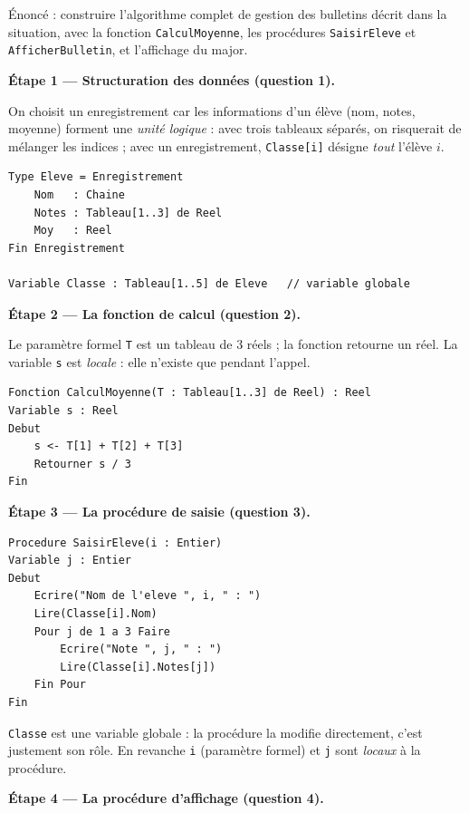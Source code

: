 \documentclass[11pt]{article}
\newcommand{\cle}[1]{{\popxbold\color{popdark}#1}}
\begin{document}
\begin{exoresolu}
Énoncé : construire l'algorithme complet de gestion des bulletins décrit dans la situation, avec la fonction \texttt{CalculMoyenne}, les procédures \texttt{SaisirEleve} et \texttt{AfficherBulletin}, et l'affichage du major.

\tcblower

\textbf{Étape 1 — Structuration des données (question 1).}

On choisit un enregistrement car les informations d'un élève (nom, notes, moyenne) forment une \emph{unité logique} : avec trois tableaux séparés, on risquerait de mélanger les indices ; avec un enregistrement, \texttt{Classe[i]} désigne \emph{tout} l'élève $i$.

\begin{lstlisting}
Type Eleve = Enregistrement
    Nom   : Chaine
    Notes : Tableau[1..3] de Reel
    Moy   : Reel
Fin Enregistrement

Variable Classe : Tableau[1..5] de Eleve   // variable globale
\end{lstlisting}

\textbf{Étape 2 — La fonction de calcul (question 2).}

Le paramètre formel \texttt{T} est un tableau de 3 réels ; la fonction retourne un réel. La variable \texttt{s} est \emph{locale} : elle n'existe que pendant l'appel.

\begin{lstlisting}
Fonction CalculMoyenne(T : Tableau[1..3] de Reel) : Reel
Variable s : Reel
Debut
    s <- T[1] + T[2] + T[3]
    Retourner s / 3
Fin
\end{lstlisting}

\textbf{Étape 3 — La procédure de saisie (question 3).}

\begin{lstlisting}
Procedure SaisirEleve(i : Entier)
Variable j : Entier
Debut
    Ecrire("Nom de l'eleve ", i, " : ")
    Lire(Classe[i].Nom)
    Pour j de 1 a 3 Faire
        Ecrire("Note ", j, " : ")
        Lire(Classe[i].Notes[j])
    Fin Pour
Fin
\end{lstlisting}

\texttt{Classe} est une \cle{variable globale} : la procédure la modifie directement, c'est justement son rôle. En revanche \texttt{i} (paramètre formel) et \texttt{j} sont \emph{locaux} à la procédure.

\textbf{Étape 4 — La procédure d'affichage (question 4).}


\end{exoresolu}
\end{document}
